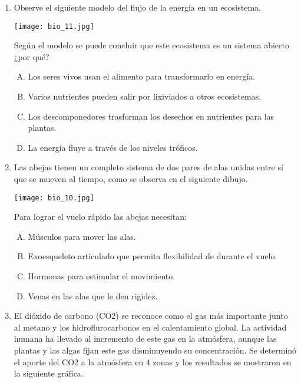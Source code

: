 \begin{enumerate}
\item  Observe el siguiente  modelo  del flujo   de la energía  en un ecosistema. \label{bio-18}
\begin{center}
\texttt{[image: bio\_11.jpg]} 
\end{center}
Según  el modelo se puede  concluir   que  este ecosistema es  un sistema  abierto ¿por qué?
\begin{enumerate}[(A)]
\item Los seres vivos usan el alimento para transformarlo en energía.
\item Varios  nutrientes  pueden salir por  lixiviados  a otros ecosistemas.
\item Los descomponedores  trasforman  los desechos   en nutrientes  para las plantas.
\item La energía fluye  a través  de los niveles    tróficos.
\end{enumerate}
\item Las  abejas  tienen un  completo   sistema   de   dos  pares  de  alas   unidas    entre  sí    que  se mueven  al tiempo,   como se  observa  en el siguiente  dibujo. \label{bio-17}
\begin{center}
\texttt{[image: bio\_10.jpg]} 
\end{center}
Para  lograr  el vuelo rápido las  abejas  necesitan:
\begin{enumerate}[(A)]
\item Músculos  para mover  las  alas.
\item Exoesqueleto  articulado  que permita flexibilidad de durante  el  vuelo.
\item Hormonas para estimular el movimiento.
\item  Venas en las alas que  le den rigidez.
\end{enumerate}



\newpage
\item El dióxido de carbono (CO2) se reconoce  como el gas  más  importante junto al  metano  y los   hidroflurocarbonos  en el calentamiento global. La actividad  humana  ha llevado  al    incremento de  este gas en la atmósfera, aunque las plantas y las algas fijan este gas  disminuyendo su  concentración.  Se determinó  el aporte del CO2  a la atmósfera en 4  zonas y los resultados se mostraron  en la siguiente gráfica. \label{bio-19}



\end{enumerate}
